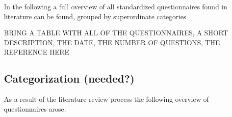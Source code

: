 		In the following a full overview of all standardized questionnaires found in literature can be found, grouped by superordinate categories.

		BRING A TABLE WITH ALL OF THE QUESTIONNAIRES, A SHORT DESCRIPTION, THE DATE, THE NUMBER OF QUESTIONS, THE REFERENCE HERE






\subsection{Categorization (needed?)}

	As a result of the literature review process the following overview of questionnaires arose. 



